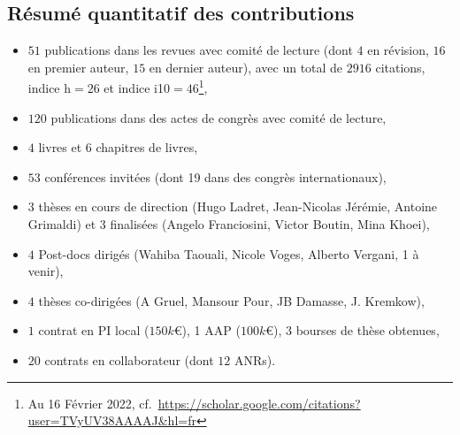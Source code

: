 \documentclass[10pt,french,a4paper,oneside]{article}%
\begin{document}

\subsection*{Résumé quantitatif des contributions}

\begin{itemize}

\item  	$51$ publications dans les revues avec comité de lecture (dont $4$ en révision, $16$ en premier auteur, $15$ en dernier auteur), avec un total de $2916$ citations, indice h$=26$ et  indice i10$=46$\footnote{Au 16 Février 2022, cf.~\url{https://scholar.google.com/citations?user=TVyUV38AAAAJ&hl=fr}},
\item	$120$ publications dans des actes de congrès avec comité de lecture,
\item	$4$ livres et $6$ chapitres de livres,
\item	$53$ conférences invitées (dont 19 dans des congrès internationaux),
\item	$3$ thèses en cours de direction (Hugo Ladret, Jean-Nicolas Jérémie, Antoine Grimaldi) et $3$ finalisées (Angelo Franciosini, Victor Boutin, Mina Khoei),
\item	$4$ Post-docs dirigés (Wahiba Taouali, Nicole Voges, Alberto Vergani, 1 à venir),
\item	$4$ thèses co-dirigées (A Gruel, Mansour Pour, JB Damasse, J. Kremkow),
\item	$1$ contrat en PI local ($150 k$\euro{}), 1 AAP ($100 k$\euro{}), $3$ bourses de thèse obtenues,
\item	$20$ contrats en collaborateur (dont $12$ ANRs).

\end{itemize} %
%
\end{document}
